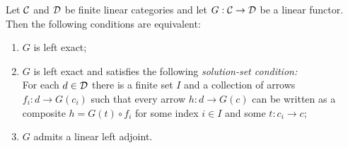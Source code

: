 \documentclass{amsart}
\begin{document}
\begin{proposition} \label{prop:AFT}
	Let $\mathcal C$ and $\mathcal D$ be finite linear categories and let $G: \mathcal C \rightarrow \mathcal D$  be a linear functor. Then the following conditions are equivalent: 
	\begin{enumerate}
		\item $G$ is left exact;  
		\item $G$ is left exact and satisfies the following {\em solution-set condition:} \\  For each $d \in \mathcal D$ there is a finite set $I$ and a collection of arrows $f_i:d \to G(c_i)$ such that every arrow $h:d \to G(c)$ can be written as a composite $h = G(t) \circ f_i$ for some index $i \in I$ and some $t: c_i \to c$; 
		\item $G$ admits a linear left adjoint.
	\end{enumerate}
\end{proposition}
\end{document}
